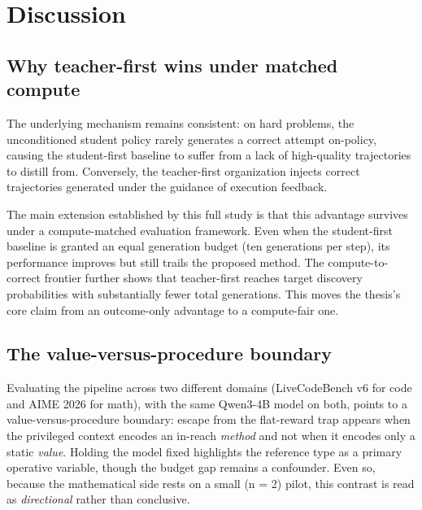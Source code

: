 \documentclass[12pt,a4paper]{report}
\begin{document}
\chapter{Discussion}\label{chapter-5-discussion}

\section{Why teacher-first wins under matched compute}\label{why-teacher-first-wins-now-compute-fair}

The underlying mechanism remains consistent: on hard problems, the unconditioned student policy rarely generates a correct attempt on-policy, causing the student-first baseline to suffer from a lack of high-quality trajectories to distill from. Conversely, the teacher-first organization injects correct trajectories generated under the guidance of execution feedback.

The main extension established by this full study is that this advantage survives under a compute-matched evaluation framework. Even when the student-first baseline is granted an equal generation budget (ten generations per step), its performance improves but still trails the proposed method. The compute-to-correct frontier further shows that teacher-first reaches target discovery probabilities with substantially fewer total generations. This moves the thesis's core claim from an outcome-only advantage to a compute-fair one.

\section{The value-versus-procedure boundary}\label{the-value-versus-procedure-boundary-validated}

Evaluating the pipeline across two different domains (LiveCodeBench v6 for code and AIME 2026 for math), with the same Qwen3-4B model on both, points to a value-versus-procedure boundary: escape from the flat-reward trap appears when the privileged context encodes an in-reach \emph{method} and not when it encodes only a static \emph{value}. Holding the model fixed highlights the reference type as a primary operative variable, though the budget gap remains a confounder. Even so, because the mathematical side rests on a small (n = 2) pilot, this contrast is read as \emph{directional} rather than conclusive.
\end{document}
